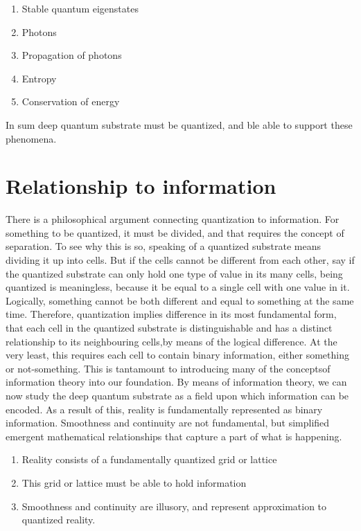 \documentclass[notitlepage]{report}
\begin{document}
\begin{enumerate}
	\item Stable quantum eigenstates
	\item Photons
	\item Propagation of photons
	\item Entropy
	\item Conservation of energy
\end{enumerate}

In sum deep quantum substrate must be quantized, and ble able to support these phenomena.  

\section*{Relationship to information}

There is a philosophical argument connecting quantization to information. For something to be quantized, it must be divided, and that requires the concept of separation. To see why this is so, speaking of a quantized substrate means dividing it up into cells. But if the cells cannot be different from each other, say if the quantized substrate can only hold one type of value in its many cells, being quantized is meaningless, because it be equal to  a single cell with one value in it. Logically, something cannot be both different and equal to something at the same time. Therefore, quantization implies difference in its most fundamental form, that each cell in the quantized substrate is distinguishable and has a distinct relationship to its neighbouring cells,by means of the logical difference. At the very least, this requires each cell to contain binary information, either something or not-something. 
This is tantamount to introducing many of the conceptsof information theory into our foundation. By means of information theory, we can now study the deep quantum substrate as a field upon which information can be encoded. As a result of this, reality is fundamentally represented as binary information. Smoothness and continuity are not fundamental, but simplified emergent mathematical relationships that capture a part of what is happening.

\begin{enumerate}

\item Reality consists of a fundamentally quantized grid or lattice
\item This grid or lattice must be able to hold information
\item Smoothness and continuity are illusory, and represent approximation to quantized reality.
\end{enumerate}
\end{document}
